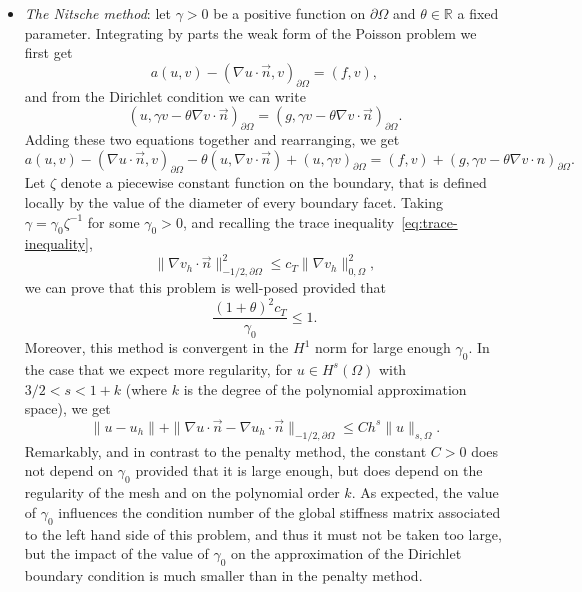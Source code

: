 \begin{itemize}
    \item \emph{The Nitsche method}: let $\gamma > 0$ be a positive function on $\partial\Omega$ and $\theta\in\mathbb{R}$ a fixed parameter. Integrating by parts the weak form of the Poisson problem we first get 
    \begin{equation}
        a(u,v) - (\nabla u\cdot \vec n, v)_{\partial\Omega} = (f,v),
    \end{equation}
    and from the Dirichlet condition we can write 
    \begin{equation}
        (u,\gamma v -\theta\nabla v\cdot \vec n)_{\partial\Omega} = (g,\gamma v - \theta \nabla v \cdot \vec n)_{\partial\Omega}.
    \end{equation}
    Adding these two equations together and rearranging, we get 
    \begin{equation}
        a(u,v) - (\nabla u \cdot \vec n, v)_{\partial\Omega} - \theta (u,\nabla v\cdot  \vec n) + (u,\gamma v)_{\partial\Omega} = (f,v) + (g,\gamma v - \theta \nabla v\cdot n)_{\partial\Omega}.
    \end{equation}
    Let $\zeta$ denote a piecewise constant function on the boundary, that is defined locally by the value of the diameter of every boundary facet. Taking $\gamma = \gamma_0 \zeta^{-1}$ for some $\gamma_0>0$, and recalling the trace inequality~\eqref{eq:trace-inequality},
    \begin{equation}
        \|\nabla v_h\cdot \vec n\|^2_{-1/2,\partial\Omega} \leq c_T \|\nabla v_h\|^2_{0,\Omega},
    \end{equation}
    we can prove that this problem is well-posed provided that 
    \begin{equation}
        \frac{(1+\theta)^2 c_T}{\gamma_0}\leq 1.
    \end{equation}
    Moreover, this method is convergent in the $H^1$ norm for large enough $\gamma_0$. In the case that we expect more regularity, for $u\in H^s(\Omega)$ with $3/2<s<1+k$ (where $k$ is the degree of the polynomial approximation space), we get
    \begin{equation}
        \|u-u_h\| + \|\nabla u\cdot \vec n - \nabla u_h\cdot \vec n\|_{-1/2,\partial\Omega} \leq Ch^s\|u\|_{s,\Omega}.
    \end{equation}
    Remarkably, and in contrast to the penalty method, the constant $C>0$ does not depend on $\gamma_0$ provided that it is large enough, but does depend on the regularity of the mesh and on the polynomial order $k$. As expected, the value of $\gamma_0$ influences the condition number of the global stiffness matrix associated to the left hand side of this problem, and thus it must not be taken too large, but the impact of the value of $\gamma_0$ on the approximation of the Dirichlet boundary condition is much smaller than in the penalty method. 
\end{itemize}

